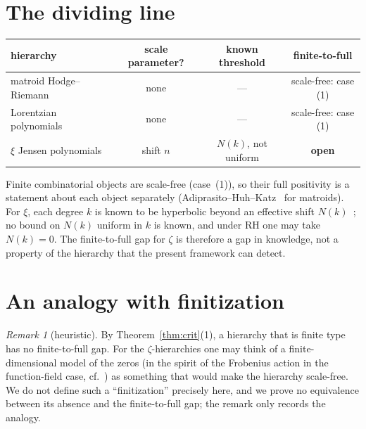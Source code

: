 \documentclass[11pt]{amsart}
\theoremstyle{definition}
\theoremstyle{remark}
\newtheorem{remark}[theorem]{Remark}
\begin{document}
\section{The dividing line}\label{sec:line}
\begin{center}
\begin{tabular}{lccc}
\hline
hierarchy & scale parameter? & known threshold & finite-to-full \\
\hline
matroid Hodge--Riemann~\cite{AHK} & none & --- & scale-free: case (1) \\
Lorentzian polynomials~\cite{BH} & none & --- & scale-free: case (1) \\
$\xi$ Jensen polynomials & shift $n$ & $N(k)$, not uniform & \textbf{open} \\
\hline
\end{tabular}
\end{center}
Finite combinatorial objects are scale-free (case~(1)), so their full positivity
is a statement about each object separately (Adiprasito--Huh--Katz~\cite{AHK}
for matroids). For $\xi$, each degree $k$ is known to be hyperbolic beyond an
effective shift $N(k)$~\cite{GORZ}; no bound on $N(k)$ uniform in $k$ is known,
and under RH one may take $N(k)=0$. The finite-to-full gap for $\zeta$ is
therefore a gap in knowledge, not a property of the hierarchy that the present
framework can detect.

\section{An analogy with finitization}
\begin{remark}[heuristic]\label{cor:fin}
By Theorem~\ref{thm:crit}(1), a hierarchy that is finite type has no
finite-to-full gap. For the $\zeta$-hierarchies one may think of a
finite-dimensional model of the zeros (in the spirit of the Frobenius action in
the function-field case, cf.~\cite{RP06}) as something that would make the
hierarchy scale-free. We do not define such a ``finitization'' precisely here,
and we prove no equivalence between its absence and the finite-to-full gap; the
remark only records the analogy.
\end{remark}
\end{document}
